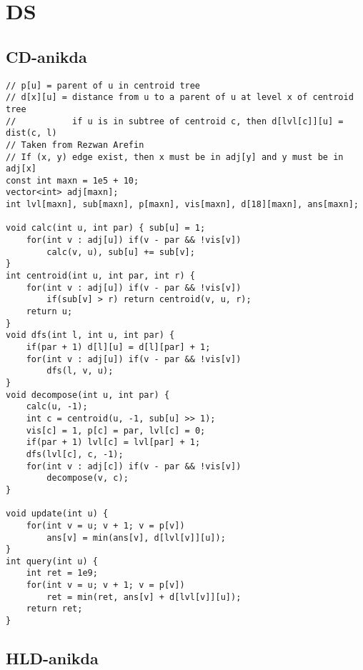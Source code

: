 \documentclass{article}
\begin{document}
\begin{multicols}{3}[]
\begin{verbatim}
\end{verbatim}


\section{DS}

\subsection{CD-anikda}

\begin{verbatim}
// p[u] = parent of u in centroid tree
// d[x][u] = distance from u to a parent of u at level x of centroid tree
//           if u is in subtree of centroid c, then d[lvl[c]][u] = dist(c, l)
// Taken from Rezwan Arefin
// If (x, y) edge exist, then x must be in adj[y] and y must be in adj[x]
const int maxn = 1e5 + 10; 
vector<int> adj[maxn]; 
int lvl[maxn], sub[maxn], p[maxn], vis[maxn], d[18][maxn], ans[maxn];
	
void calc(int u, int par) { sub[u] = 1; 
	for(int v : adj[u]) if(v - par && !vis[v]) 
		calc(v, u), sub[u] += sub[v];
}
int centroid(int u, int par, int r) {
	for(int v : adj[u]) if(v - par && !vis[v]) 
		if(sub[v] > r) return centroid(v, u, r);
	return u;
}
void dfs(int l, int u, int par) {
	if(par + 1) d[l][u] = d[l][par] + 1; 
	for(int v : adj[u]) if(v - par && !vis[v]) 
		dfs(l, v, u);
}
void decompose(int u, int par) {
	calc(u, -1);
	int c = centroid(u, -1, sub[u] >> 1);
	vis[c] = 1, p[c] = par, lvl[c] = 0; 
	if(par + 1) lvl[c] = lvl[par] + 1;
	dfs(lvl[c], c, -1);
	for(int v : adj[c]) if(v - par && !vis[v]) 
		decompose(v, c);
}

void update(int u) {
	for(int v = u; v + 1; v = p[v]) 
		ans[v] = min(ans[v], d[lvl[v]][u]);
}
int query(int u) {
	int ret = 1e9;
	for(int v = u; v + 1; v = p[v])
		ret = min(ret, ans[v] + d[lvl[v]][u]);
	return ret;
}

\end{verbatim}


\subsection{HLD-anikda}


\end{multicols}
\end{document}
